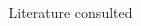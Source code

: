 \begin{frame}
\begin{columns}[t]
\begin{column}{.18\linewidth}
    \end{column}
    \begin{column}{.18\linewidth}
    \begin{example}
         

    \end{example}
    \begin{block}{Literature consulted}
        \nocite{lockhart_NahuatlWrittenLessons2001,andrews_ClaNahuatl03,jordan_BriefNotesNahuatl,canger_ReduplicationNahuatlDialectal1981,wood_OnlineNahuatlDictionary}
        \printbibliography
    \end{block}
    \end{column}
\end{columns}
\vfill
\end{frame}
